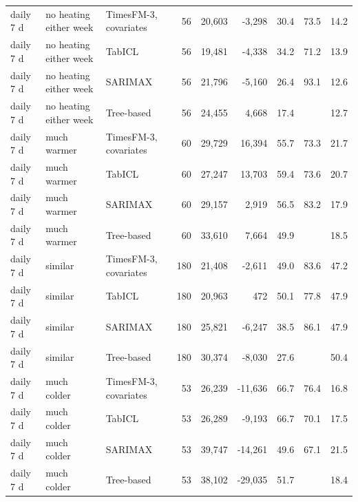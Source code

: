 \begin{tabular}{lllrrrrrr}
daily 7 d & no heating either week & TimesFM-3, covariates & 56 & 20,603 & -3,298 & 30.4 & 73.5 & 14.2 \\
daily 7 d & no heating either week & TabICL & 56 & 19,481 & -4,338 & 34.2 & 71.2 & 13.9 \\
daily 7 d & no heating either week & SARIMAX & 56 & 21,796 & -5,160 & 26.4 & 93.1 & 12.6 \\
daily 7 d & no heating either week & Tree-based & 56 & 24,455 & 4,668 & 17.4 &  & 12.7 \\
daily 7 d & much warmer & TimesFM-3, covariates & 60 & 29,729 & 16,394 & 55.7 & 73.3 & 21.7 \\
daily 7 d & much warmer & TabICL & 60 & 27,247 & 13,703 & 59.4 & 73.6 & 20.7 \\
daily 7 d & much warmer & SARIMAX & 60 & 29,157 & 2,919 & 56.5 & 83.2 & 17.9 \\
daily 7 d & much warmer & Tree-based & 60 & 33,610 & 7,664 & 49.9 &  & 18.5 \\
daily 7 d & similar & TimesFM-3, covariates & 180 & 21,408 & -2,611 & 49.0 & 83.6 & 47.2 \\
daily 7 d & similar & TabICL & 180 & 20,963 & 472 & 50.1 & 77.8 & 47.9 \\
daily 7 d & similar & SARIMAX & 180 & 25,821 & -6,247 & 38.5 & 86.1 & 47.9 \\
daily 7 d & similar & Tree-based & 180 & 30,374 & -8,030 & 27.6 &  & 50.4 \\
daily 7 d & much colder & TimesFM-3, covariates & 53 & 26,239 & -11,636 & 66.7 & 76.4 & 16.8 \\
daily 7 d & much colder & TabICL & 53 & 26,289 & -9,193 & 66.7 & 70.1 & 17.5 \\
daily 7 d & much colder & SARIMAX & 53 & 39,747 & -14,261 & 49.6 & 67.1 & 21.5 \\
daily 7 d & much colder & Tree-based & 53 & 38,102 & -29,035 & 51.7 &  & 18.4 \\
\bottomrule
\end{tabular}
